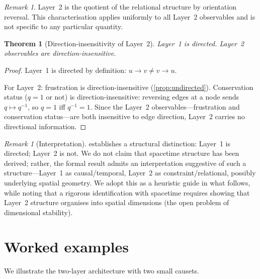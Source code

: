 \documentclass[11pt,a4paper]{article}
\theoremstyle{definition}
\theoremstyle{plain}
\newtheorem{theorem}[definition]{Theorem}
\theoremstyle{remark}
\newtheorem{remark}[definition]{Remark}
\begin{document}
\begin{remark}
  Layer~2 is the quotient of the relational structure by orientation reversal.  This characterisation applies uniformly to all Layer~2 observables and is not specific to any particular quantity.
\end{remark}

\begin{theorem}[Direction-insensitivity of Layer~2]\label{thm:split}
  Layer~1 is directed.  Layer~2 observables are direction-insensitive.
\end{theorem}

\begin{proof}
  Layer~1 is directed by definition: $u \to v \neq v \to u$.

  For Layer~2: frustration is direction-insensitive (\cref{prop:undirected}).  Conservation status ($q = 1$ or not) is direction-insensitive: reversing edges at a node sends $q \mapsto q^{-1}$, so $q = 1$ iff $q^{-1} = 1$.  Since the Layer~2 observables---frustration and conservation status---are both insensitive to edge direction, Layer~2 carries no directional information.
\end{proof}

\begin{remark}[Interpretation]
   establishes a structural distinction: Layer~1 is directed; Layer~2 is not.  We do not claim that spacetime structure has been derived; rather, the formal result admits an interpretation suggestive of such a structure---Layer~1 as causal/temporal, Layer~2 as constraint/relational, possibly underlying spatial geometry.  We adopt this as a heuristic guide in what follows, while noting that a rigorous identification with spacetime requires showing that Layer~2 structure organises into spatial dimensions (the open problem of dimensional stability).
\end{remark}

\section{Worked examples}\label{sec:example}

We illustrate the two-layer architecture with two small causets.
\end{document}

